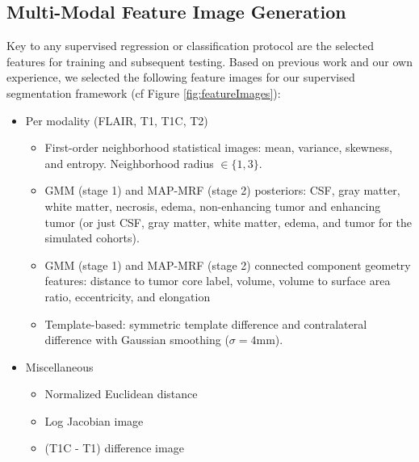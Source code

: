 \documentclass{llncs}
\begin{document}
\subsection{Multi-Modal Feature Image Generation}

Key to any supervised regression or classification protocol are the 
selected features for training and subsequent testing.  Based on previous
work and our own experience, we selected the following feature images
for our supervised segmentation framework (cf Figure \ref{fig:featureImages}):
\begin{itemize}
  \item Per modality (FLAIR, T1, T1C, T2)
    \begin{itemize}
      \item First-order neighborhood statistical images:
            mean, variance, skewness, and entropy. 
            Neighborhood radius $\in \{1,3\}$.
    \item GMM (stage 1) and MAP-MRF (stage 2) posteriors: CSF, gray matter, white 
          matter, necrosis, edema, non-enhancing tumor and enhancing tumor (or just 
          CSF, gray matter, white 
          matter, edema, and tumor for the simulated cohorts).
    \item GMM (stage 1) and MAP-MRF (stage 2) connected component geometry 
          features:  distance to tumor core label, volume, volume to surface area ratio, eccentricity, and elongation
    \item Template-based:  symmetric template difference and 
          contralateral difference with Gaussian smoothing ($\sigma = 4$mm).
    \end{itemize}
  \item Miscellaneous
    \begin{itemize}
    \item Normalized Euclidean distance
    \item Log Jacobian image
    \item (T1C - T1) difference image
    \end{itemize}
\end{itemize}
\end{document}
